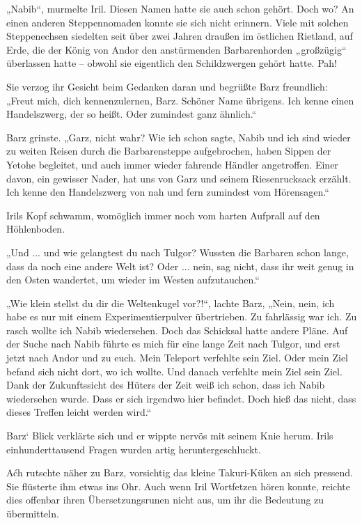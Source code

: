 „Nabib“, murmelte Iril. Diesen Namen hatte sie auch schon gehört. Doch wo? An einen anderen Steppennomaden konnte sie sich nicht erinnern. Viele mit solchen Steppenechsen siedelten seit über zwei Jahren draußen im östlichen Rietland, auf Erde, die der König von Andor den anstürmenden Barbarenhorden „großzügig“ überlassen hatte – obwohl sie eigentlich den Schildzwergen gehört hatte. Pah!

Sie verzog ihr Gesicht beim Gedanken daran und begrüßte Barz freundlich: „Freut mich, dich kennenzulernen, Barz. Schöner Name übrigens. Ich kenne einen Handelszwerg, der so heißt. Oder zumindest ganz ähnlich.“

Barz grinste. „Garz, nicht wahr? Wie ich schon sagte, Nabib und ich sind wieder zu weiten Reisen durch die Barbarensteppe aufgebrochen, haben Sippen der Yetohe begleitet, und auch immer wieder fahrende Händler angetroffen. Einer davon, ein gewisser Nader, hat uns von Garz und seinem Riesenrucksack erzählt. Ich kenne den Handelszwerg von nah und fern zumindest vom Hörensagen.“

Irils Kopf schwamm, womöglich immer noch vom harten Aufprall auf den Höhlenboden.

„Und ... und wie gelangtest du nach Tulgor? Wussten die Barbaren schon lange, dass da noch eine andere Welt ist? Oder ... nein, sag nicht, dass ihr weit genug in den Osten wandertet, um wieder im Westen aufzutauchen.“

„Wie klein stellst du dir die Weltenkugel vor?!“, lachte Barz, „Nein, nein, ich habe es nur mit einem Experimentierpulver übertrieben. Zu fahrlässig war ich. Zu rasch wollte ich Nabib wiedersehen. Doch das Schicksal hatte andere Pläne. Auf der Suche nach Nabib führte es mich für eine lange Zeit nach Tulgor, und erst jetzt nach Andor und zu euch. Mein Teleport verfehlte sein Ziel. Oder mein Ziel befand sich nicht dort, wo ich wollte. Und danach verfehlte mein Ziel sein Ziel. Dank der Zukunftssicht des Hüters der Zeit weiß ich schon, dass ich Nabib wiedersehen wurde. Dass er sich irgendwo hier befindet. Doch hieß das nicht, dass dieses Treffen leicht werden wird.“

Barz‘ Blick verklärte sich und er wippte nervös mit seinem Knie herum. Irils einhunderttausend Fragen wurden artig heruntergeschluckt.

Aćh rutschte näher zu Barz, vorsichtig das kleine Takuri-Küken an sich pressend. Sie flüsterte ihm etwas ins Ohr. Auch wenn Iril Wortfetzen hören konnte, reichte dies offenbar ihren Übersetzungsrunen nicht aus, um ihr die Bedeutung zu übermitteln.

